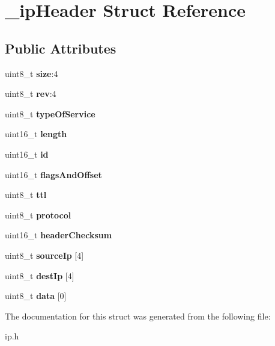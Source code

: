 \hypertarget{struct__ipHeader}{}\section{\+\_\+ip\+Header Struct Reference}
\label{struct__ipHeader}
\subsection*{Public Attributes}
\begin{DoxyCompactItemize}
\item 
\mbox{\label{struct__ipHeader_a73d0b3ca182782ffdf4185695e542bed}} 
uint8\+\_\+t {\bfseries size}\+:4
\item 
\mbox{\label{struct__ipHeader_a78817fe0f8a50b109a2d363908aacd7e}} 
uint8\+\_\+t {\bfseries rev}\+:4
\item 
\mbox{\label{struct__ipHeader_ad05cb0a46178ce1e2ad5bd70477bcab0}} 
uint8\+\_\+t {\bfseries type\+Of\+Service}
\item 
\mbox{\label{struct__ipHeader_aa57d8aded3d774453b430c48b537037b}} 
uint16\+\_\+t {\bfseries length}
\item 
\mbox{\label{struct__ipHeader_a7d8dea2d6d12f6a9df6aa7351eb0f51e}} 
uint16\+\_\+t {\bfseries id}
\item 
\mbox{\label{struct__ipHeader_a4acedf015fa0b20895027c41579fd969}} 
uint16\+\_\+t {\bfseries flags\+And\+Offset}
\item 
\mbox{\label{struct__ipHeader_ab8b31781ffe4bba98f9d7441cde7a430}} 
uint8\+\_\+t {\bfseries ttl}
\item 
\mbox{\label{struct__ipHeader_a2fd883d2f1fae6b284bffe605c7c0191}} 
uint8\+\_\+t {\bfseries protocol}
\item 
\mbox{\label{struct__ipHeader_a188591a18d300fa918419b432732e875}} 
uint16\+\_\+t {\bfseries header\+Checksum}
\item 
\mbox{\label{struct__ipHeader_acb7602cdc4168dbc81785c9d8ad4b8d0}} 
uint8\+\_\+t {\bfseries source\+Ip} \mbox{[}4\mbox{]}
\item 
\mbox{\label{struct__ipHeader_a6bb2871daa56f2608e2ef62866fce3d4}} 
uint8\+\_\+t {\bfseries dest\+Ip} \mbox{[}4\mbox{]}
\item 
\mbox{\label{struct__ipHeader_a97ae9e02145ea5df5a2fe2afdf8955b6}} 
uint8\+\_\+t {\bfseries data} \mbox{[}0\mbox{]}
\end{DoxyCompactItemize}


The documentation for this struct was generated from the following file\+:\begin{DoxyCompactItemize}
\item 
ip.\+h\end{DoxyCompactItemize}
